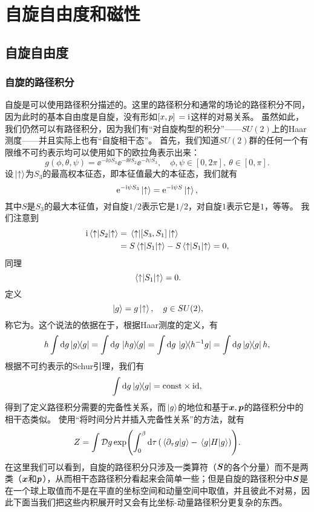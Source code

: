 \chapter{自旋自由度和磁性}

\section{自旋自由度}

\subsection{自旋的路径积分}

自旋是可以使用路径积分描述的。这里的路径积分和通常的场论的路径积分不同，因为此时的基本自由度是自旋，没有形如$\comm*{x}{p} = \ii$这样的对易关系。
虽然如此，我们仍然可以有路径积分，因为我们有“对自旋构型的积分”——$SU(2)$上的Haar测度——并且实际上也有“自旋相干态”。
首先，我们知道$SU(2)$群的任何一个有限维不可约表示均可以使用如下的欧拉角表示出来：
\begin{equation}
    g(\phi, \theta, \psi) = \ee^{- \ii \phi S_3} \ee^{- \ii \theta S_2} \ee^{- \ii \psi S_3}, \quad \phi, \psi \in [0, 2\pi], \ \theta \in [0, \pi].
\end{equation}
设$\ket*{\uparrow}$为$S_3$的最高权本征态，即本征值最大的本征态，我们就有
\begin{equation}
    \mathrm{e}^{- \mathrm{i} \psi S_3} \ket*{\uparrow} = \mathrm{e}^{- \mathrm{i} \psi S} \ket*{\uparrow},
\end{equation}
其中$S$是$S_3$的最大本征值，对自旋$1/2$表示它是$1/2$，对自旋$1$表示它是$1$，等等。
我们注意到
\[
    \begin{aligned}
        \ii \mel*{\uparrow}{S_2}{\uparrow} &= \mel*{\uparrow}{\comm*{S_3}{S_1}}{\uparrow} \\
        &= S \mel*{\uparrow}{S_1}{\uparrow} - S \mel*{\uparrow}{S_1}{\uparrow} = 0,
    \end{aligned}
\]
同理
\[
    \mel*{\uparrow}{S_1}{\uparrow} = 0.
\]
定义
\begin{equation}
    \ket*{g} = g \ket*{\uparrow}, \quad g \in SU(2),
\end{equation}
称它为。这个说法的依据在于，根据Haar测度的定义，有
\[
    h \int \dd{g} \dyad{g} = \int \dd{g} \dyad*{hg}{g} = \int \dd{g} \dyad*{g}{h^{-1} g} = \int \dd{g} \dyad{g} h, 
\]
根据不可约表示的Schur引理，我们有
\begin{equation}
    \int \dd{g} \dyad{g} = \const \times \mathrm{id}, 
\end{equation}
得到了定义路径积分需要的完备性关系，而$\ket*{g}$的地位和基于$\vb*{x}, \vb*{p}$的路径积分中的相干态类似。
使用“将时间分片并插入完备性关系”的方法，就有
\begin{equation}
    Z = \int \mathcal{D} g \exp(\int_0^\beta \dd{\tau} (\braket*{\partial_\tau g}{g} - \mel*{g}{H}{g})).
    \label{eq:spin-partition-original}
\end{equation}
在这里我们可以看到，自旋的路径积分只涉及一类算符（$\vb*{S}$的各个分量）而不是两类（$\vb*{x}$和$\vb*{p}$），从而相干态路径积分看起来会简单一些；但是自旋的路径积分中$\vb*{S}$是在一个球上取值而不是在平直的坐标空间和动量空间中取值，并且彼此不对易，因此下面当我们把这些内积展开时又会有比坐标-动量路径积分更复杂的东西。

